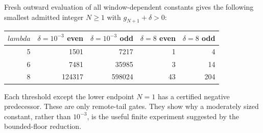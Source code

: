 \documentclass[11pt]{article}
\def\lambda{lambda}%
\theoremstyle{remark}
\begin{document}
Fresh outward evaluation of all window-dependent constants gives the
following smallest admitted integer $N\ge1$ with $g_{N+1}+\delta>0$:
\begin{center}
\begin{tabular}{rrrrr}
\toprule
$\lambda$ & $\delta=10^{-3}$ even & $\delta=10^{-3}$ odd
 & $\delta=8$ even & $\delta=8$ odd\\
\midrule
5&1501&7217&1&4\\
6&7481&35985&3&14\\
8&124317&598024&43&204\\
\bottomrule
\end{tabular}
\end{center}
Each threshold except the lower endpoint $N=1$ has a certified
negative predecessor. These are only remote-tail gates. They show
why a moderately sized constant, rather than $10^{-3}$, is the useful
finite experiment suggested by the bounded-floor reduction.
\end{document}
